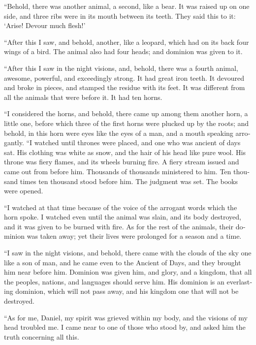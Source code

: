 \begin{paracol}{2}
\begin{otherlanguage}{english}
 ``Behold, there was another animal, a second, like a
bear. It was raised up on one side, and three ribs were in its mouth
between its teeth. They said this to it: `Arise! Devour much flesh!'

 ``After this I saw, and behold, another, like a leopard,
which had on its back four wings of a bird. The animal also had four
heads; and dominion was given to it.

 ``After this I saw in the night visions, and, behold,
there was a fourth animal, awesome, powerful, and exceedingly strong. It
had great iron teeth. It devoured and broke in pieces, and stamped the
residue with its feet. It was different from all the animals that were
before it. It had ten horns.

 ``I considered the horns, and behold, there came up among
them another horn, a little one, before which three of the first horns
were plucked up by the roots; and behold, in this horn were eyes like
the eyes of a man, and a mouth speaking arrogantly.  ``I
watched until thrones were placed, and one who was ancient of days sat.
His clothing was white as snow, and the hair of his head like pure wool.
His throne was fiery flames, and its wheels burning fire.
 A fiery stream issued and came out from before him.
Thousands of thousands ministered to him. Ten thousand times ten
thousand stood before him. The judgment was set. The books were opened.

 ``I watched at that time because of the voice of the
arrogant words which the horn spoke. I watched even until the animal was
slain, and its body destroyed, and it was given to be burned with fire.
 As for the rest of the animals, their dominion was taken
away; yet their lives were prolonged for a season and a time.

 ``I saw in the night visions, and behold, there came
with the clouds of the sky one like a son of man, and he came even to
the Ancient of Days, and they brought him near before him.
 Dominion was given him, and glory, and a kingdom, that
all the peoples, nations, and languages should serve him. His dominion
is an everlasting dominion, which will not pass away, and his kingdom
one that will not be destroyed.

 ``As for me, Daniel, my spirit was grieved within my
body, and the visions of my head troubled me.  I came
near to one of those who stood by, and asked him the truth concerning
all this.


\end{otherlanguage}
\end{paracol}
